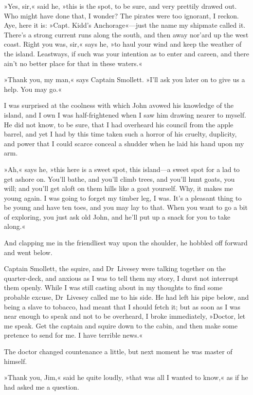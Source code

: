 »Yes, sir,« said he, »this is the spot, to be sure, and very prettily drawed out. Who might have done that, I wonder? The pirates were too ignorant, I reckon. Aye, here it is: »Capt. Kidd's Anchorage«—just the name my shipmate called it. There's a strong current runs along the south, and then away nor'ard up the west coast. Right you was, sir,« says he, »to haul your wind and keep the weather of the island. Leastways, if such was your intention as to enter and careen, and there ain't no better place for that in these waters.«

»Thank you, my man,« says Captain Smollett. »I'll ask you later on to give us a help. You may go.«

I was surprised at the coolness with which John avowed his knowledge of the island, and I own I was half-frightened when I saw him drawing nearer to myself. He did not know, to be sure, that I had overheard his council from the apple barrel, and yet I had by this time taken such a horror of his cruelty, duplicity, and power that I could scarce conceal a shudder when he laid his hand upon my arm.

»Ah,« says he, »this here is a sweet spot, this island—a sweet spot for a lad to get ashore on. You'll bathe, and you'll climb trees, and you'll hunt goats, you will; and you'll get aloft on them hills like a goat yourself. Why, it makes me young again. I was going to forget my timber leg, I was. It's a pleasant thing to be young and have ten toes, and you may lay to that. When you want to go a bit of exploring, you just ask old John, and he'll put up a snack for you to take along.«

And clapping me in the friendliest way upon the shoulder, he hobbled off forward and went below.

Captain Smollett, the squire, and Dr~Livesey were talking together on the quarter-deck, and anxious as I was to tell them my story, I durst not interrupt them openly. While I was still casting about in my thoughts to find some probable excuse, Dr~Livesey called me to his side. He had left his pipe below, and being a slave to tobacco, had meant that I should fetch it; but as soon as I was near enough to speak and not to be overheard, I broke immediately, »Doctor, let me speak. Get the captain and squire down to the cabin, and then make some pretence to send for me. I have terrible news.«

The doctor changed countenance a little, but next moment he was master of himself.

»Thank you, Jim,« said he quite loudly, »that was all I wanted to know,« as if he had asked me a question.

